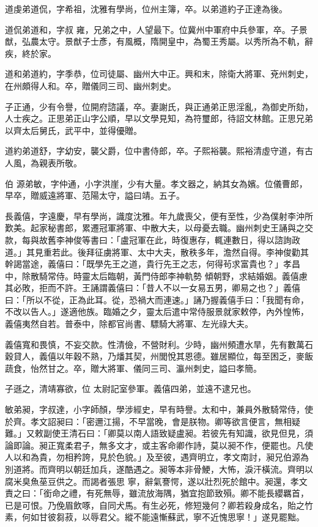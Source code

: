 \begin{pinyinscope}
 道虔弟道侃，字希祖，沈雅有學尚，位州主簿，卒。以弟道約子正達為後。



 道侃弟道和，字叔
 雍，兄弟之中，人望最下。位冀州中軍府中兵參軍，卒。子景猷，弘農太守。景猷子士彥，有風概，隋開皇中，為蜀王秀屬。以秀所為不軌，辭疾，終於家。



 道和弟道約，字季恭，位司徒屬、幽州大中正。興和末，除衛大將軍、兗州刺史，在州頗得人和。卒，贈儀同三司、幽州刺史。



 子正通，少有令譽，位開府諮議，卒。妻謝氏，與正通弟正思淫亂，為御史所劾，人士疾之。正思弟正山字公順，早以文學見知，為符璽郎，待詔文林館。正思兄弟以齊太后舅氏，武平中，並得優贈。



 道約弟道舒，字幼安，襲父爵，位中書侍郎，卒。子熙裕襲。熙裕清虛守道，有古人風，為親表所敬。



 伯
 源弟敏，字仲通，小字洪崖，少有大量。孝文器之，納其女為嬪。位儀曹郎，早卒，贈威遠將軍、范陽太守，謚曰靖。五子。



 長義僖，字遠慶，早有學尚，識度沈雅。年九歲喪父，便有至性，少為僕射李沖所歎美。起家秘書郎，累遷冠軍將軍、中散大夫，以母憂去職。幽州刺史王誦與之交款，每與故舊李神俊等書曰：「盧冠軍在此，時復惠存，輒連數日，得以諮詢政道。」其見重若此。後拜征虜將軍、太中大夫，散秩多年，澹然自得。李神俊勸其幹謁當途，義僖曰：「既學先王之道，貴行先王之志，何得茍求富貴也？」孝昌中，除散騎常侍。時靈太后臨朝，黃門侍郎李神軌勢
 傾朝野，求結婚姻。義僖慮其必敗，拒而不許。王誦謂義僖曰：「昔人不以一女易五男，卿易之也？」義僖曰：「所以不從，正為此耳。從，恐禍大而連速。」誦乃握義僖手曰：「我聞有命，不改以告人。」遂適他族。臨婚之夕，靈太后遣中常侍服景就家敕停，內外惶怖，義僖夷然自若。普泰中，除都官尚書、驃騎大將軍、左光祿大夫。



 義僖寬和畏慎，不妄交款。性清儉，不營財利。少時，幽州頻遭水旱，先有數萬石穀貸人，義僖以年穀不熟，乃燔其契，州閭悅其恩德。雖居顯位，每至困乏，麥飯蔬食，怡然甘之。卒，贈大將軍、儀同三司、瀛州刺史，謚曰孝簡。



 子遜之，清靖寡欲，位
 太尉記室參軍。義僖四弟，並遠不逮兄也。



 敏弟昶，字叔達，小字師顏，學涉經史，早有時譽。太和中，兼員外散騎常侍，使於齊。孝文詔昶曰：「密邇江揚，不早當晚，會是朕物。卿等欲言便言，無相疑難。」又敕副使王清石曰：「卿莫以南人語致疑盧昶。若彼先有知識，欲見但見，須論即論。昶正寬柔君子，無多文才，或主客命卿作詩，莫以昶不作，便罷也。凡使人以和為貴，勿相矜誇，見於色貌。」及至彼，遇齊明立，孝文南討，昶兄伯源為別道將。而齊明以朝廷加兵，遂酷遇之。昶等本非骨鯁，大怖，淚汗橫流。齊明以腐米臭魚莝豆供之。而謁者張思
 寧，辭氣謇愕，遂以壯烈死於館中。昶還，孝文責之曰：「銜命之禮，有死無辱，雖流放海隅，猶宜抱節致殞。卿不能長纓羈首，已是可恨。乃俛眉飲啄，自同犬馬。有生必死，修短幾何？卿若殺身成名，貽之竹素，何如甘彼芻菽，以辱君父。縱不能遠慚蘇武，寧不近愧思寧！」遂見罷黜。




\end{pinyinscope}
